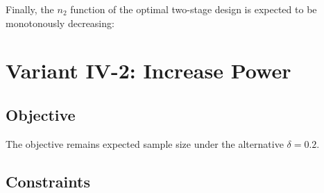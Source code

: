 \documentclass[
]{book}
\newenvironment{Shaded}{\begin{snugshade}}{\end{snugshade}}
\newcommand{\CommentTok}[1]{\textcolor[rgb]{0.56,0.35,0.01}{\textit{#1}}}
\newcommand{\DecValTok}[1]{\textcolor[rgb]{0.00,0.00,0.81}{#1}}
\newcommand{\KeywordTok}[1]{\textcolor[rgb]{0.13,0.29,0.53}{\textbf{#1}}}
\newcommand{\NormalTok}[1]{#1}
\newcommand{\OperatorTok}[1]{\textcolor[rgb]{0.81,0.36,0.00}{\textbf{#1}}}
\newcommand{\StringTok}[1]{\textcolor[rgb]{0.31,0.60,0.02}{#1}}
\begin{document}
\begin{Shaded}
\end{Shaded}

Finally, the \(n_2\) function of the optimal two-stage design is expected to be
monotonously decreasing:

\begin{Shaded}
\end{Shaded}

\hypertarget{variantIV_2}{%
\section{Variant IV-2: Increase Power}\label{variantIV_2}}

\hypertarget{objective-8}{%
\subsection{Objective}\label{objective-8}}

The objective remains expected sample size under the alternative \(\delta = 0.2\).

\hypertarget{constraints-8}{%
\subsection{Constraints}\label{constraints-8}}
\end{document}

